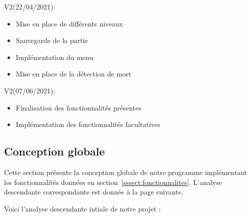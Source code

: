             V2(22/04/2021):
            \begin{itemize}
               \item Mise en place de différents niveaux
               \item Sauvegarde de la partie
               \item Implémentation du menu
                \item Mise en place de la détection de mort
            \end{itemize}
            \vspace{0.2cm}
            
            V2(07/06/2021):
            \begin{itemize}
               \item Finalisation des fonctionnalités présentes
               \item Implémentation des fonctionnalités facultatives
               
            \end{itemize}



    \subsection{Conception globale}
        Cette section présente la conception globale de notre programme implémentant les fonctionnalités données en section~\ref{sssect:fonctionnalites}.
        L'analyse descendante correspondante est donnée à la page suivante.
        
        \newpage
        
        Voici l'analyse descendante intiale de notre projet :
        \vspace{0.3cm}
        
        
